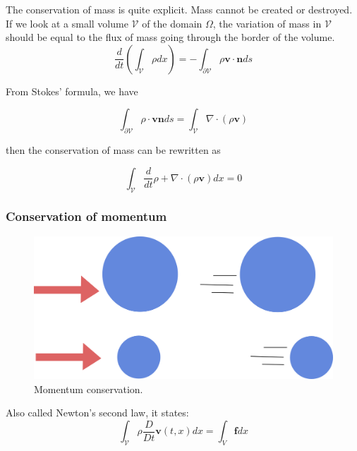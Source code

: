 \documentclass[11pt, oneside, a4paper]{memoir}
\begin{document}
The conservation of mass is quite explicit. Mass cannot be created or destroyed. If we look at a small volume $\mathcal{V}$ of the domain $\Omega$, the variation of mass in $\mathcal{V}$ should be equal to the flux of mass going through the border of the volume.
\begin{equation}
    \label{eq:massConservation}
    \frac{d}{dt}\left( \int_{\mathcal{V}} \rho dx \right)
    =
    - \int_{\mathcal{\partial V}}\rho \mathbf{v} \cdot \mathbf{n} ds
\end{equation}

From Stokes' formula, we have

\begin{equation}
\int_{\partial \mathcal{V}} \rho \cdot \mathbf{v} \mathbf{n} ds =
\int_{\mathcal{V}} \nabla \cdot \left( \rho \mathbf{v} \right)
\end{equation}

then the conservation of mass can be rewritten as

\begin{equation}
\int_{\mathcal{V}} \frac{d}{dt} \rho + \nabla \cdot \left( \rho  \mathbf{v} \right) dx = 0
\end{equation}

\subsubsection{Conservation of momentum}

\begin{figure}[!ht]
\centering
\includegraphics[scale=0.5]{images/continuum_mechanics/momentumConservation.png}
\caption{\label{fig:momentumConservation} Momentum conservation.}
\end{figure}

Also called Newton's second law, it states:
\begin{equation}
\label{eq:momentumConservation}
\int_{\mathcal{V}} \rho \frac{D}{Dt} \mathbf{v}(t,x) dx = \int_{V} \mathbf{f} dx
\end{equation}
\end{document}
